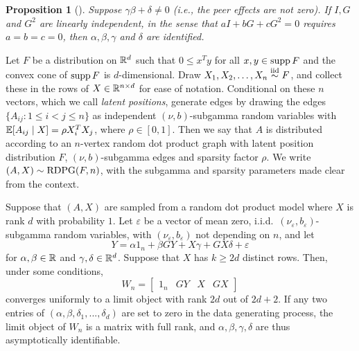\documentclass[aspectratio=169]{beamer}
\newtheorem{proposition}{Proposition}
\theoremstyle{remark}
\begin{document}
\begin{frame}
    \begin{proposition}[\citealt{bramoulle2009}]
        Suppose $\gamma \beta + \delta \neq 0$ (i.e., the peer effects are not zero). If $I, G$ and $G^2$ are linearly independent, in the sense that $a I + b G + c G^2 = 0$ requires $a = b = c = 0$, then $\alpha, \beta, \gamma$ and $\delta$ are identified.
    \end{proposition}
\end{frame}

\begin{frame}

    \begin{definition}
        Let $F$ be a distribution on $\mathbb{R}^d$ such that $0 \le x^T y$ for all $x,y \in \operatorname*{supp} F$ and the convex cone of $\operatorname*{supp} F$ is $d$-dimensional.
        Draw $X_1,X_2,\dots,X_n \stackrel{\mathrm{iid}}{\sim} F$, and collect these in the rows of $X \in \mathbb{R}^{n \times d}$ for ease of notation.
        Conditional on these $n$ vectors, which we call {\em latent positions}, generate edges by drawing the edges $\{ A_{ij} : 1 \le i < j \le n \}$ as independent $(\nu,b)$-subgamma random variables with $\mathbb{E}[ A_{ij} \mid X ] = \rho X_i^T X_j$, where $\rho \in [0,1]$.
        Then we say that $A$ is distributed according to an $n$-vertex random dot product graph with latent position distribution $F$, $(\nu,b)$-subgamma edges and sparsity factor $\rho$.
        We write $(A,X) \sim \operatorname{RDPG}( F, n)$, with the subgamma and sparsity parameters made clear from the context.
    \end{definition}
    
\end{frame}


\begin{frame}
    \begin{theorem}
        Suppose that $(A, X)$ are sampled from a random dot product model where $X$ is rank $d$ with probability $1$.
        Let $\varepsilon$ be a vector of mean zero, i.i.d.~$(\nu_\varepsilon, b_\varepsilon)$-subgamma random variables, with $(\nu_\varepsilon, b_\varepsilon)$ not depending on $n$,
        and let
        \begin{equation*}
            Y = \alpha 1_n + \beta G Y + X \gamma + G X \delta + \varepsilon
        \end{equation*}
        for $\alpha, \beta \in \mathbb{R}$ and $\gamma, \delta \in \mathbb{R}^d$. Suppose that $X$ has $k \ge 2d$ distinct rows. Then, under some conditions,
        \begin{equation*}
            W_n = \begin{bmatrix}
                1_n & GY & X & GX
            \end{bmatrix}
        \end{equation*}
        converges uniformly to a limit object with rank $2d$ out of $2d + 2$. If any two entries of $(\alpha, \beta, \delta_1, ..., \delta_d)$ are set to zero in the data generating process, the limit object of $W_n$ is a matrix with full rank, and $\alpha, \beta, \gamma, \delta$ are thus asymptotically identifiable.
    \end{theorem}
\end{frame}
\end{document}
